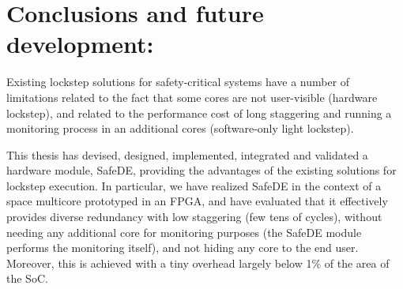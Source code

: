 \documentclass[a4paper,12pt]{article}
\begin{document}



%
%
%
%
%






%


\clearpage
\section{Conclusions and future development: }


Existing lockstep solutions for safety-critical systems have a number of limitations related to the fact that some cores are not user-visible (hardware lockstep), and related to the performance cost of long staggering and running a monitoring process in an additional cores (software-only light lockstep). 

This thesis has devised, designed, implemented, integrated and validated a hardware module, SafeDE, providing the advantages of the existing solutions for lockstep execution. In particular, we have realized SafeDE in the context of a space multicore prototyped in an FPGA, and have evaluated that it effectively provides diverse redundancy with low staggering (few tens of cycles), without needing any additional core for monitoring purposes (the SafeDE module performs the monitoring itself), and not hiding any core to the end user. Moreover, this is achieved with a tiny overhead largely below 1\% of the area of the SoC. 
\end{document}
